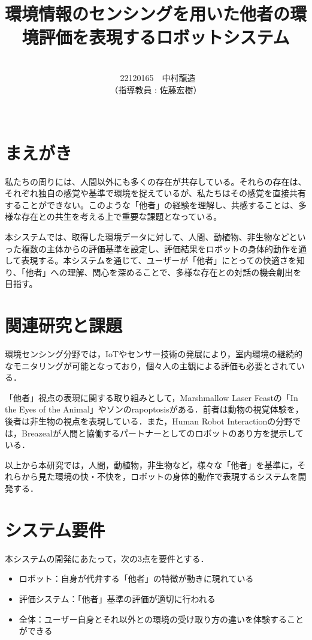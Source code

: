 \documentclass[paper=a4paper,jafontsize=9pt,head_space=15mm,gutter=20mm,
twocolumn,number_of_lines=49, line_length=26zw]{myuarticle}
\begin{document}
\title{{\LARGE\bfseries\gtfamily 環境情報のセンシングを用いた他者の環境評価を表現するロボットシステム}}
\author{\\\ 22120165　中村龍造 \\ （指導教員 : 佐藤宏樹）\\ \\}
\date{}
\maketitle

\section{まえがき}
私たちの周りには、人間以外にも多くの存在が共存している。それらの存在は、それぞれ独自の感覚や基準で環境を捉えているが、私たちはその感覚を直接共有することができない。このような「他者」の経験を理解し、共感することは、多様な存在との共生を考える上で重要な課題となっている。

本システムでは、取得した環境データに対して、人間、動植物、非生物などといった複数の主体からの評価基準を設定し、評価結果をロボットの身体的動作を通して表現する。本システムを通じて、ユーザーが「他者」にとっての快適さを知り、「他者」への理解、関心を深めることで、多様な存在との対話の機会創出を目指す。

\section{関連研究と課題}

環境センシング分野では，IoTやセンサー技術の発展により，室内環境の継続的なモニタリングが可能となっており\cite{Saini-2020-IndoorAirQualityMonitoring}，個々人の主観による評価も必要とされている\cite{Coulby-2020-ScopingReviewTechnologicalApproaches}．

「他者」視点の表現に関する取り組みとして，Marshmallow Laser Feastの「In the Eyes of the Animal」\cite{Dezeen-2015-MarshmallowLaserFeastsEyes}やソンのrapoptosis\cite{--ソンヨン}がある．前者は動物の視覚体験を，後者は非生物の視点を表現している．また，Human Robot Interactionの分野では，Breazeal\cite{C.Breazeal-2004-SocialInteractionsHRIRobot}が人間と協働するパートナーとしてのロボットのあり方を提示している．

以上から本研究では，人間，動植物，非生物など，様々な「他者」を基準に，それらから見た環境の快・不快を，ロボットの身体的動作で表現するシステムを開発する．

\section{システム要件}
本システムの開発にあたって，次の3点を要件とする．
\begin{itemize}
  \item ロボット：自身が代弁する「他者」の特徴が動きに現れている
  \item 評価システム：「他者」基準の評価が適切に行われる
  \item 全体：ユーザー自身とそれ以外との環境の受け取り方の違いを体験することができる
\end{itemize}
\end{document}
